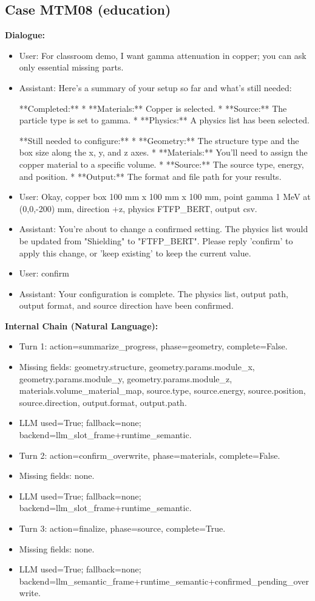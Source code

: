 \documentclass[11pt]{ctexart}
\begin{document}
\subsection{Case MTM08 (education)}
\textbf{Dialogue:}
\begin{itemize}
\item User: For classroom demo, I want gamma attenuation in copper; you can ask only essential missing parts.
\item Assistant: Here's a summary of your setup so far and what's still needed:

**Completed:**
*   **Materials:** Copper is selected.
*   **Source:** The particle type is set to gamma.
*   **Physics:** A physics list has been selected.

**Still needed to configure:**
*   **Geometry:** The structure type and the box size along the x, y, and z axes.
*   **Materials:** You'll need to assign the copper material to a specific volume.
*   **Source:** The source type, energy, and position.
*   **Output:** The format and file path for your results.
\item User: Okay, copper box 100 mm x 100 mm x 100 mm, point gamma 1 MeV at (0,0,-200) mm, direction +z, physics FTFP\_BERT, output csv.
\item Assistant: You're about to change a confirmed setting. The physics list would be updated from "Shielding" to "FTFP\_BERT". Please reply 'confirm' to apply this change, or 'keep existing' to keep the current value.
\item User: confirm
\item Assistant: Your configuration is complete. The physics list, output path, output format, and source direction have been confirmed.
\end{itemize}
\textbf{Internal Chain (Natural Language):}
\begin{itemize}
\item Turn 1: action=summarize\_progress, phase=geometry, complete=False.
\item Missing fields: geometry.structure, geometry.params.module\_x, geometry.params.module\_y, geometry.params.module\_z, materials.volume\_material\_map, source.type, source.energy, source.position, source.direction, output.format, output.path.
\item LLM used=True; fallback=none; backend=llm\_slot\_frame+runtime\_semantic.
\item Turn 2: action=confirm\_overwrite, phase=materials, complete=False.
\item Missing fields: none.
\item LLM used=True; fallback=none; backend=llm\_slot\_frame+runtime\_semantic.
\item Turn 3: action=finalize, phase=source, complete=True.
\item Missing fields: none.
\item LLM used=True; fallback=none; backend=llm\_semantic\_frame+runtime\_semantic+confirmed\_pending\_overwrite.
\end{itemize}
\end{document}
